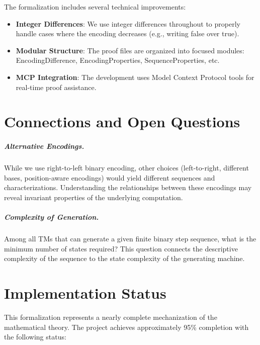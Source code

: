 \begin{lemma}
The formalization includes several technical improvements:
\begin{itemize}
\item \textbf{Integer Differences}: We use integer differences throughout to properly handle cases where the encoding decreases (e.g., writing false over true).
\item \textbf{Modular Structure}: The proof files are organized into focused modules: EncodingDifference, EncodingProperties, SequenceProperties, etc.
\item \textbf{MCP Integration}: The development uses Model Context Protocol tools for real-time proof assistance.
\end{itemize}

\chapter{Connections and Open Questions}

\paragraph{Alternative Encodings.} 
While we use right-to-left binary encoding, other choices (left-to-right, different bases, position-aware encodings) would yield different sequences and characterizations. Understanding the relationships between these encodings may reveal invariant properties of the underlying computation.

\paragraph{Complexity of Generation.} 
Among all TMs that can generate a given finite binary step sequence, what is the minimum number of states required? This question connects the descriptive complexity of the sequence to the state complexity of the generating machine.

\chapter{Implementation Status}

This formalization represents a nearly complete mechanization of the mathematical theory. The project achieves approximately 95\% completion with the following status:


\end{lemma}
